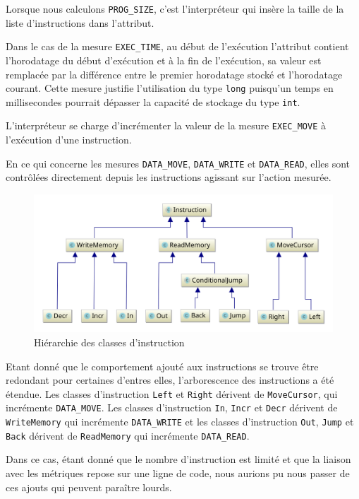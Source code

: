 \documentclass[titlepage]{article}
\begin{document}
    Lorsque nous calculons \texttt{PROG\_SIZE}, c'est l'interpréteur qui insère la taille de la liste d'instructions dans l'attribut.


    Dans le cas de la mesure \texttt{EXEC\_TIME}, au début de l'exécution l'attribut contient l'horodatage du début d'exécution et à la fin de l'exécution, sa valeur est remplacée par la différence entre le premier horodatage stocké et l'horodatage courant. Cette mesure justifie l'utilisation du type \texttt{long} puisqu'un temps en millisecondes pourrait dépasser la capacité de stockage du type \texttt{int}.


     L'interpréteur se charge d'incrémenter la valeur de la mesure  \texttt{EXEC\_MOVE} à l'exécution d'une instruction.


    En ce qui concerne les mesures \texttt{DATA\_MOVE}, \texttt{DATA\_WRITE} et \texttt{DATA\_READ}, elles sont contrôlées directement depuis les instructions agissant sur l'action mesurée.


\begin{figure}[!hb]
        \centering
        \includegraphics[scale=0.6]{svgL3/instructions}
        \caption{Hiérarchie des classes d'instruction}
\end{figure}

    Etant donné que le comportement ajouté aux instructions se trouve être redondant pour certaines d'entres elles, l'arborescence des instructions a été étendue. Les classes d'instruction \texttt{Left} et \texttt{Right} dérivent de \texttt{MoveCursor}, qui incrémente \texttt{DATA\_MOVE}. Les classes d'instruction \texttt{In}, \texttt{Incr} et \texttt{Decr} dérivent de \texttt{WriteMemory} qui incrémente \texttt{DATA\_WRITE} et les classes d'instruction \texttt{Out}, \texttt{Jump} et \texttt{Back} dérivent de \texttt{ReadMemory} qui incrémente \texttt{DATA\_READ}.

    Dans ce cas, étant donné que le nombre d'instruction est limité et que la liaison avec les métriques repose sur une ligne de code, nous aurions pu nous passer de ces ajouts qui peuvent paraître lourds.
\end{document}
